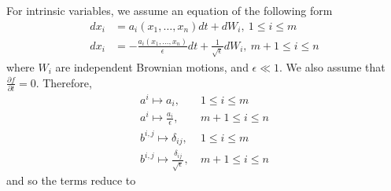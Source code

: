 \documentclass[12pt]{article}
\begin{document}
For intrinsic variables, we assume an equation of the following form 
\begin{equation} \label{eq:general_SDE}
\begin{aligned}
dx_i &= a_i(x_1, \dots, x_n) dt + dW_i, \: 1 \le i \le m \\
dx_i &= -\frac{a_i(x_1, \dots, x_n)}{\epsilon} dt + \frac{1}{\sqrt{\epsilon}} dW_i , \: m+1 \le i \le n
\end{aligned}
\end{equation}
where $W_i$ are independent Brownian motions, and $\epsilon \ll 1$.
%
We also assume that $\frac{\partial f}{\partial t} = 0$. 
%
Therefore,
\begin{equation}
\begin{aligned}
a^i \mapsto a_i, \: & 1 \le i \le m \\
a^i \mapsto \frac{a_i}{\epsilon}, \: & m+1 \le i \le n \\
b^{i,j} \mapsto \delta_{ij}, \: & 1 \le i \le m \\
b^{i,j} \mapsto \frac{\delta_{ij}}{\sqrt{\epsilon}}, \: & m+1 \le i \le n 
\end{aligned}
\end{equation}
%
and so the terms reduce to
%
\end{document}

